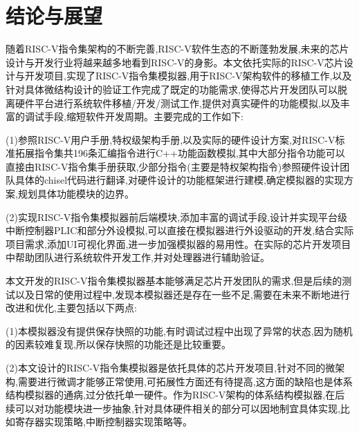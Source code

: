 
\chapter{结论与展望}
随着RISC-V指令集架构的不断完善,RISC-V软件生态的不断蓬勃发展,未来的芯片设计与开发行业将越来越多地看到RISC-V的身影。本文依托实际的RISC-V芯片设计与开发项目,实现了RISC-V指令集模拟器,用于RISC-V架构软件的移植工作,以及针对具体微结构设计的验证工作完成了既定的功能需求,使得芯片开发团队可以脱离硬件平台进行系统软件移植/开发/测试工作,提供对真实硬件的功能模拟,以及丰富的调试手段,缩短软件开发周期。主要完成的工作如下:


(1)参照RISC-V用户手册,特权级架构手册,以及实际的硬件设计方案,对RISC-V标准拓展指令集共196条汇编指令进行C++功能函数模拟,其中大部分指令功能可以直接由RISC-V指令集手册获取,少部分指令(主要是特权架构指令)参照硬件设计团队具体的chisel代码进行翻译,对硬件设计的功能框架进行建模,确定模拟器的实现方案,规划具体功能模块的边界。


(2)实现RISC-V指令集模拟器前后端模块,添加丰富的调试手段,设计并实现平台级中断控制器PLIC和部分外设模拟,可以直接在模拟器进行外设驱动的开发,结合实际项目需求,添加UI可视化界面,进一步加强模拟器的易用性。在实际的芯片开发项目中帮助团队进行系统软件开发工作,并对处理器进行辅助验证。


本文开发的RISC-V指令集模拟器基本能够满足芯片开发团队的需求,但是后续的测试以及日常的使用过程中,发现本模拟器还是存在一些不足,需要在未来不断地进行改进和优化,主要包括以下两点:


(1)本模拟器没有提供保存快照的功能,有时调试过程中出现了异常的状态,因为随机的因素较难复现,所以保存快照的功能还是比较重要。


(2)本文设计的RISC-V指令集模拟器是依托具体的芯片开发项目,针对不同的微架构,需要进行微调才能够正常使用,可拓展性方面还有待提高,这方面的缺陷也是体系结构模拟器的通病,过分依托单一硬件。作为RISC-V架构的体系结构模拟器,在后续可以对功能模块进一步抽象,针对具体硬件相关的部分可以因地制宜具体实现,比如寄存器实现策略,中断控制器实现策略等。

